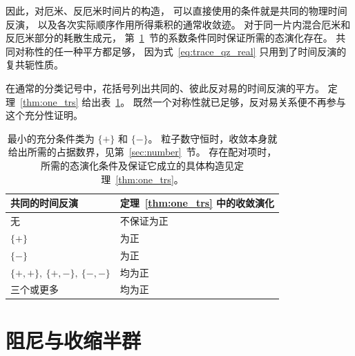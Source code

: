 \documentclass[UTF8,11pt,a4paper,fontset=fandol]{ctexart}
\numberwithin{equation}{section}
\begin{document}
因此，对厄米、反厄米时间片的构造，
可以直接使用的条件就是共同的物理时间反演，
以及各次实际顺序作用所得乘积的通常收敛迹。
对于同一片内混合厄米和反厄米部分的耗散生成元，
第~\ref{sec:contraction}~节的系数条件同时保证所需的态演化存在。
共同对称性的任一种平方都足够，
因为式~\eqref{eq:trace_qz_real} 只用到了时间反演的复共轭性质。

在通常的分类记号中，花括号列出共同的、彼此反对易的时间反演的平方。
定理~\ref{thm:one_trs} 给出表~\ref{tab:trs}。
既然一个对称性就已足够，反对易关系便不再参与这个充分性证明。
\begin{table}[H]
 \centering
 \begin{tabular}{ll}
 \toprule
 共同的时间反演 & 定理~\ref{thm:one_trs} 中的收敛演化\\
 \midrule
 无 & 不保证为正\\
 $\{+\}$ & 为正\\
 $\{-\}$ & 为正\\
 $\{+,+\},\ \{+,-\},\ \{-,-\}$ & 均为正\\
 三个或更多 & 均为正\\
 \bottomrule
 \end{tabular}
 \caption{最小的充分条件类为 $\{+\}$ 和 $\{-\}$。
 粒子数守恒时，收敛本身就给出所需的占据数界，见第~\ref{sec:number}~节。
 存在配对项时，所需的态演化条件及保证它成立的具体构造见定理~\ref{thm:one_trs}。}
 \label{tab:trs}
\end{table}

\section{阻尼与收缩半群}
\label{sec:contraction}
\end{document}
